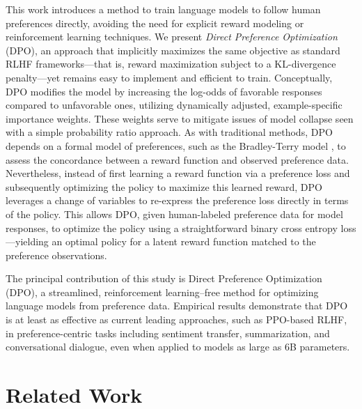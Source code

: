 This work introduces a method to train language models to follow human preferences directly, avoiding the need for explicit reward modeling or reinforcement learning techniques. We present \textit{Direct Preference Optimization} (DPO), an approach that implicitly maximizes the same objective as standard RLHF frameworks—that is, reward maximization subject to a KL-divergence penalty—yet remains easy to implement and efficient to train. Conceptually, DPO modifies the model by increasing the log-odds of favorable responses compared to unfavorable ones, utilizing dynamically adjusted, example-specific importance weights. These weights serve to mitigate issues of model collapse seen with a simple probability ratio approach. As with traditional methods, DPO depends on a formal model of preferences, such as the Bradley-Terry model \cite{bradley1952rankanalysis}, to assess the concordance between a reward function and observed preference data. Nevertheless, instead of first learning a reward function via a preference loss and subsequently optimizing the policy to maximize this learned reward, DPO leverages a change of variables to re-express the preference loss directly in terms of the policy. This allows DPO, given human-labeled preference data for model responses, to optimize the policy using a straightforward binary cross entropy loss—yielding an optimal policy for a latent reward function matched to the preference observations.

The principal contribution of this study is Direct Preference Optimization (DPO), a streamlined, reinforcement learning–free method for optimizing language models from preference data. Empirical results demonstrate that DPO is at least as effective as current leading approaches, such as PPO-based RLHF, in preference-centric tasks including sentiment transfer, summarization, and conversational dialogue, even when applied to models as large as 6B parameters.

\section{Related Work}

